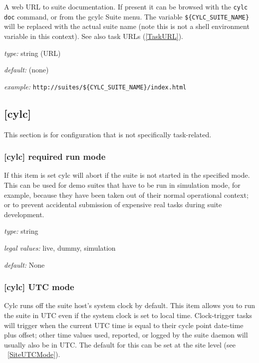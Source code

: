 A web URL to suite documentation.  If present it can be browsed with the
\lstinline=cylc doc= command, or from the gcylc Suite menu.  The variable
\lstinline=${CYLC_SUITE_NAME}= will be replaced with the actual suite name
(note this is not a shell environment variable in this context). See also
task URLs (\ref{TaskURL}).

\begin{myitemize}
\item {\em type:} string (URL)
\item {\em default:} (none)
\item {\em example:} \lstinline=http://suites/${CYLC_SUITE_NAME}/index.html=
\end{myitemize}

\subsection{[cylc]}

This section is for configuration that is not specifically task-related.

\subsubsection[required run mode]{ [cylc] \textrightarrow required run mode}

If this item is set cylc will abort if the suite is not started in the
specified mode. This can be used for demo suites that have to be
run in simulation mode, for example, because they have been taken out of
their normal operational context; or to prevent accidental submission of
expensive real tasks during suite development.
\begin{myitemize}
    \item {\em type:} string
    \item {\em legal values:} live, dummy, simulation
    \item {\em default:} None
\end{myitemize}

\subsubsection[UTC mode]{ [cylc] \textrightarrow UTC mode}
\label{UTC-mode}

Cylc runs off the suite host's system clock by default. This item allows
you to run the suite in UTC even if the system clock is set to local time.
Clock-trigger tasks will trigger when the current UTC time is equal to
their cycle point date-time plus offset; other time values used, reported,
or logged by the suite daemon will usually also be in UTC. The default for
this can be set at the site level (see ~\ref{SiteUTCMode}).


